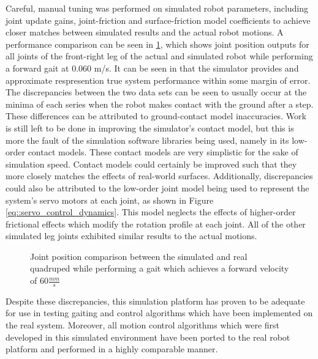 		Careful, manual tuning was performed on simulated robot parameters, including joint update gains, joint-friction and surface-friction model coefficients to achieve closer matches between simulated results and the actual robot motions. A performance comparison can be seen in \ref{fig::sim_performance_comparison}, which shows joint position outputs for all joints of the front-right leg of the actual and simulated robot while performing a forward gait at $0.060$ m/s. It can be seen in  that the simulator provides and approximate respresention true system performance within some margin of error. The discrepancies between the two data sets can be seen to usually occur at the minima of each series when the robot makes contact with the ground after a step. These differences can be attributed to ground-contact model inaccuracies. Work is still left to be done in improving the simulator's contact model, but this is more the fault of the simulation software libraries being used, namely in its low-order contact models. These contact models are very simplistic for the sake of simulation speed. Contact models could certainly be improved such that they more closely matches the effects of real-world surfaces. Additionally, discrepancies could also be attributed to the low-order joint model being used to represent the system's servo motors at each joint, as shown in Figure \ref{eq::servo_control_dynamics}. This model neglects the effects of higher-order frictional effects which modify the rotation profile at each joint. All of the other simulated leg joints exhibited similar results to the actual motions.
%	
	\begin{figure}[!t]
		\centering
		\caption{Joint position comparison between the simulated and real quadruped while performing a gait which achieves a forward velocity of $60\frac{mm}{s}$}
		\label{fig::sim_performance_comparison}
	\end{figure}
%
	Despite these discrepancies, this simulation platform has proven to be adequate for use in testing gaiting and control algorithms which have been implemented on the real system. Moreover, all motion control algorithms which were first developed in this simulated environment have been ported to the real robot platform and performed in a highly comparable manner.

